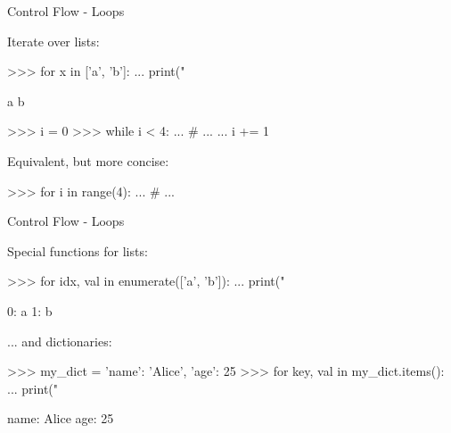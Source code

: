\documentclass[10pt]{beamer}
\begin{document}

\begin{frame}[fragile]{Control Flow - Loops}

    Iterate over lists:

    \begin{pythoncode}
        >>> for x in ['a', 'b']:
        ...     print("%

        a
        b
    \end{pythoncode}

    \pause

    \begin{pythoncode}
        >>> i = 0
        >>> while i < 4:
        ...     # ...
        ...     i += 1
    \end{pythoncode}

    Equivalent, but more concise:

    \begin{pythoncode}
        >>> for i in range(4):
        ...     # ...
    \end{pythoncode}

\end{frame}


\begin{frame}[fragile]{Control Flow - Loops}

    Special functions for lists:

    \begin{pythoncode}
        >>> for idx, val in enumerate(['a', 'b']):
        ...     print("%

        0: a
        1: b
    \end{pythoncode}

    \pause

    ... and dictionaries:

    \begin{pythoncode}
        >>> my_dict = {'name': 'Alice', 'age': 25}
        >>> for key, val in my_dict.items():
        ...     print("%

        name: Alice
        age: 25
    \end{pythoncode}
\end{frame}

\end{document}
